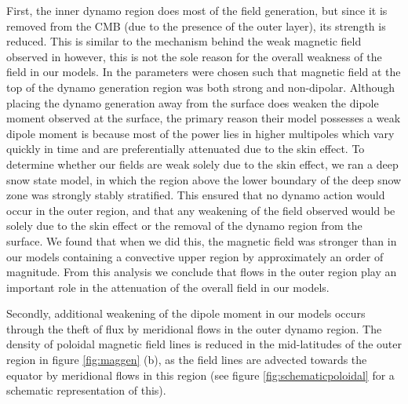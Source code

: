 First, the inner dynamo region does most of the field generation, but since it is removed from the CMB (due to the presence of the outer layer), its strength is reduced. This is similar to the mechanism behind the weak magnetic field observed in \citet{christensen06} however, this is not the sole reason for the overall weakness of the field in our models. In  \citet{christensen06} the parameters were chosen such that magnetic field at the top of the dynamo generation region was both strong and non-dipolar. Although placing the dynamo generation away from the surface does weaken the dipole moment observed at the surface, the primary reason their model possesses a weak dipole moment is because most of the power lies in higher multipoles which vary quickly in time and are preferentially attenuated due to the skin effect. To determine whether our fields are weak solely due to the skin effect, we ran a deep snow state model, in which the region above the lower boundary of the deep snow zone was strongly stably stratified. This ensured that no dynamo action would occur in the outer region, and that any weakening of the field observed would be solely due to the skin effect or the removal of the dynamo region from the surface. We found that when we did this, the magnetic field was stronger than in our models containing a convective upper region by approximately an order of magnitude. From this analysis we conclude that flows in the outer region play an important role in the attenuation of the overall field in our models.

Secondly, additional weakening of the dipole moment in our models occurs through the theft of flux by meridional flows in the outer dynamo region. The density of poloidal magnetic field lines is reduced in the mid-latitudes of the outer region in figure \ref{fig:maggen} (b), as the field lines are advected towards the equator by meridional flows in this region (see figure \ref{fig:schematicpoloidal} for a schematic representation of this).

